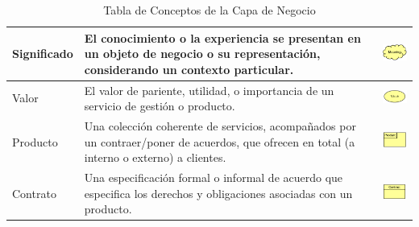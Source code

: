 \begin{table}[H]
\begin{tabular}{| m{4cm} | m{4cm} | m{4cm} | }
		\hline
		\centering\vspace{1.52mm}Significado & \vspace{1.52mm}El conocimiento o la experiencia se presentan en un objeto de negocio o su representación, considerando un contexto particular. & \vspace{1.52mm}\includegraphics[width=20mm]{arquitectura/imagenes/113} \\
		\hline
		\centering\vspace{1.52mm}Valor & \vspace{1.52mm}El valor de pariente, utilidad, o importancia de un servicio de gestión o producto. & \vspace{1.52mm}\includegraphics[width=25mm]{arquitectura/imagenes/114} \\
		\hline
		\centering\vspace{1.52mm}Producto & \vspace{1.52mm}Una colección coherente de servicios, acompañados por un contraer/poner de acuerdos, que ofrecen en total (a interno o externo) a clientes. & \vspace{1.52mm}\includegraphics[width=20mm]{arquitectura/imagenes/115} \\
		\hline
		\centering\vspace{1.52mm}Contrato & \vspace{1.52mm}Una especificación formal o informal de acuerdo que especifica los derechos y obligaciones asociadas con un producto. & \vspace{1.52mm}\includegraphics[width=20mm]{arquitectura/imagenes/116} \\
		\hline
	\end{tabular}
	\caption{Tabla de Conceptos de la Capa de Negocio}
	\label{fig:negocio}
\end{table}

